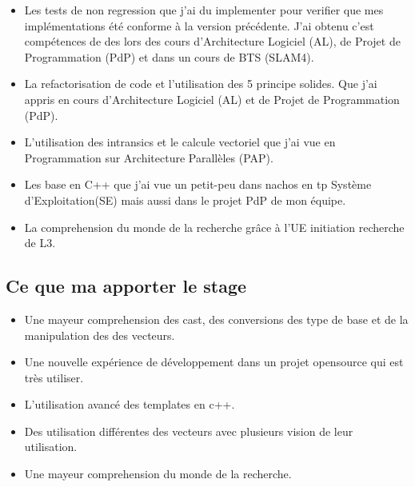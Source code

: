 \begin{itemize}
  \item Les tests de non regression que j'ai du implementer pour verifier que mes
  implémentations été conforme à la version précédente. J'ai obtenu c'est compétences de
  des lors des cours d'Architecture Logiciel (AL), de Projet de Programmation (PdP) et dans
  un cours de BTS (SLAM4).
  \item La refactorisation de code et l'utilisation des 5 principe solides. Que j'ai
  appris en cours d'Architecture Logiciel (AL) et de Projet de Programmation (PdP).
  \item L'utilisation des intransics et le calcule vectoriel que j'ai vue en Programmation
  sur Architecture Parallèles (PAP).
  \item Les base en C++ que j'ai vue un petit-peu dans nachos en tp Système
  d'Exploitation(SE) mais aussi dans le projet PdP de mon équipe.
  \item La comprehension du monde de la recherche grâce à l'UE initiation recherche de L3.
\end{itemize}

\subsection{Ce que ma apporter le stage}

\begin{itemize}
  \item Une mayeur comprehension des cast, des conversions des type de base et de la
  manipulation des des vecteurs.
  \item Une nouvelle expérience de développement dans un projet opensource qui est très
  utiliser.
  \item L'utilisation avancé des templates en c++.
  \item Des utilisation différentes des vecteurs avec plusieurs vision de leur
  utilisation.
  \item Une mayeur comprehension du monde de la recherche.
\end{itemize}
